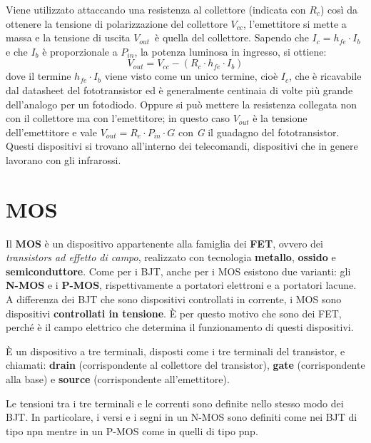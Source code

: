 \documentclass[12pt, a4paper]{report}
\begin{document}
Viene utilizzato attaccando una resistenza al collettore (indicata con $R_{c}$) così da ottenere la tensione di polarizzazione del collettore $V_{cc}$, l'emettitore si mette a massa e la tensione di uscita $V_{out}$\, è quella del collettore. Sapendo che $I_{c} = h_{fe} \cdot I_{b}$ e che $I_{b}$ è proporzionale a $P_{in}$, la potenza luminosa in ingresso, si ottiene:
\begin{equation*}
    V_{out} = V_{cc} - ( R_{c} \cdot h_{fe} \cdot I_{b})
\end{equation*}
dove il termine $h_{fe} \cdot I_{b}$ viene visto come un unico termine, cioè $I_{c}$, che è ricavabile dal datasheet del fototransistor ed è generalmente centinaia di volte più grande dell'analogo per un fotodiodo. Oppure si può mettere la resistenza collegata non con il collettore ma con l'emettitore; in questo caso $V_{out}$ è la tensione dell'emettitore e vale $V_{out} =  R_{e} \cdot P_{in} \cdot G$ con \textit{G} il guadagno del fototransistor. Questi dispositivi si trovano all'interno dei telecomandi, dispositivi che in genere lavorano con gli infrarossi.

\chapter{MOS}
Il \textbf{MOS} è un dispositivo appartenente alla famiglia dei \textbf{FET}, ovvero dei \textit{transistors ad effetto di campo}, realizzato con tecnologia \textbf{metallo}, \textbf{ossido} e \textbf{semiconduttore}. Come per i BJT, anche per i MOS esistono due varianti: gli \textbf{N-MOS} e i \textbf{P-MOS}, rispettivamente a portatori elettroni e a portatori lacune. A differenza dei BJT che sono dispositivi controllati in corrente, i MOS sono dispositivi \textbf{controllati in tensione}. È per questo motivo che sono dei FET, perché è il campo elettrico che determina il funzionamento di questi dispositivi.

È un dispositivo a tre terminali, disposti come i tre terminali del transistor, e chiamati: \textbf{drain} (corrispondente al collettore del transistor), \textbf{gate} (corrispondente alla base) e \textbf{source} (corrispondente all'emettitore).

Le tensioni tra i tre terminali e le correnti sono definite nello stesso modo dei BJT. In particolare, i versi e i segni in un N-MOS sono definiti come nei BJT di tipo npn mentre in un P-MOS come in quelli di tipo pnp.
\end{document}
